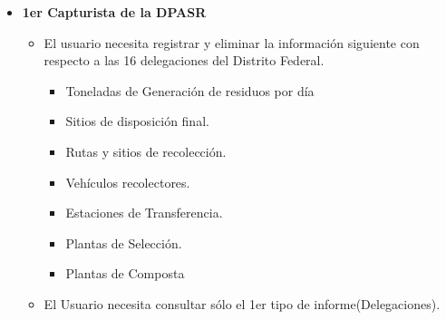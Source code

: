 \begin{itemize}
	\item \textbf{1er Capturista de la DPASR }
	\begin{itemize}
		\item El usuario necesita registrar y eliminar la información siguiente con respecto a las 16  delegaciones del Distrito Federal.
		\begin{itemize}
			\item Toneladas de Generación de residuos por día
			\item Sitios de disposición final.
			\item Rutas y sitios de recolección.
			\item Vehículos recolectores.
			\item Estaciones de Transferencia.
			\item Plantas de Selección.
			\item Plantas de Composta
		\end{itemize}
		\item El Usuario necesita consultar sólo el 1er tipo de informe(Delegaciones).
	\end{itemize}
	

\end{itemize}
